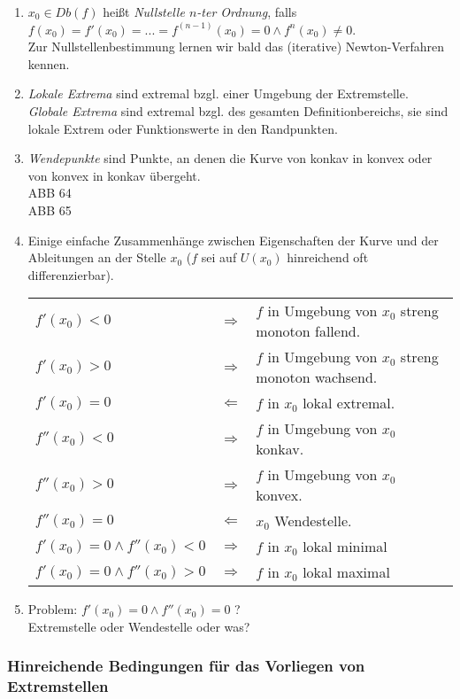 \begin{enumerate}
\item $x_0 \in Db(f)$ heißt \emph{Nullstelle $n$-ter Ordnung}, falls \\
$f(x_0) = f'(x_0)=...=f^{(n-1)}(x_0)=0 \wedge f^n (x_0) \not = 0$.\\
Zur Nullstellenbestimmung lernen wir bald das (iterative) Newton-Verfahren kennen.
\item \emph{Lokale Extrema} sind extremal bzgl. einer Umgebung der Extremstelle.\\
\emph{Globale Extrema} sind extremal bzgl. des gesamten Definitionbereichs, sie sind lokale Extrem oder Funktionswerte in den Randpunkten.
\item \emph{Wendepunkte} sind Punkte, an denen die Kurve von konkav in konvex oder von konvex in konkav übergeht.\\
ABB 64\\
ABB 65
\item Einige einfache Zusammenhänge zwischen Eigenschaften der Kurve und der Ableitungen an der Stelle $x_0$ ($f$ sei auf $U(x_0)$ hinreichend oft differenzierbar).\\
\begin{tabular}{l c l }
$f'(x_0)<0$ & $\Rightarrow$ & $f$ in Umgebung von $x_0$ streng monoton fallend.\\
$f'(x_0)>0$ & $\Rightarrow$ & $f$ in Umgebung von $x_0$ streng monoton wachsend.\\
$f'(x_0)=0$ & $\Leftarrow$ & $f$ in $x_0$ lokal extremal.\\
\hline
$f''(x_0)<0$ & $\Rightarrow$ & $f$ in Umgebung von $x_0$ konkav.\\
$f''(x_0)>0$ & $\Rightarrow$ & $f$ in Umgebung von $x_0$ konvex.\\
$f''(x_0)=0$ & $\Leftarrow$ & $x_0$ Wendestelle.\\
\hline 
$f'(x_0)=0 \wedge f''(x_0)<0$ & $\Rightarrow$ & $f$ in $x_0$ lokal minimal\\
$f'(x_0)=0 \wedge f''(x_0)>0$ & $\Rightarrow$ & $f$ in $x_0$ lokal maximal\\
\end{tabular}
\item Problem: $f'(x_0)=0 \wedge f''(x_0)=0$ ?\\
Extremstelle oder Wendestelle oder was?
\end{enumerate}
\subsubsection*{Hinreichende Bedingungen für das Vorliegen von Extremstellen}
